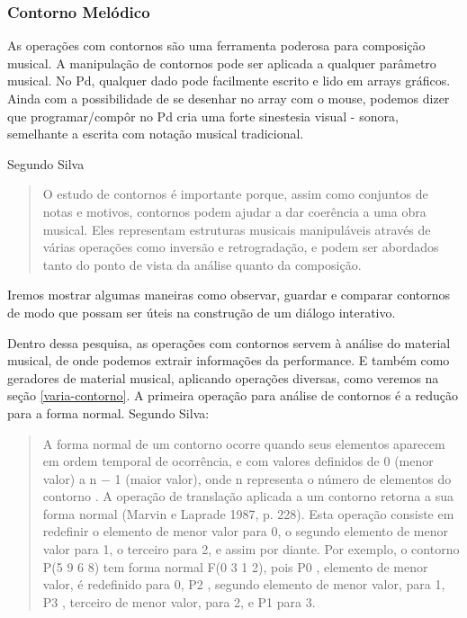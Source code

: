 \documentclass{ppgmus}
\begin{document}
\subsubsection{Contorno Melódico}
\label{contornos}


As operações com contornos são uma ferramenta poderosa para
composição musical\cite{sampaio08:torno}. A manipulação de contornos
pode ser aplicada a qualquer parâmetro musical.
No Pd, qualquer dado pode facilmente escrito e lido em arrays gráficos.
Ainda com a possibilidade de se desenhar no array com o mouse, podemos
dizer que programar/compôr no Pd cria uma
forte sinestesia visual - sonora, semelhante a escrita
com notação musical tradicional.

Segundo Silva \begin{quotation}
               O estudo de contornos é importante porque, assim como conjuntos de notas e motivos,
               contornos podem ajudar a dar coerência a uma obra musical. Eles representam estruturas
		musicais manipuláveis através de várias operações como inversão e retrogradação, e podem
		ser abordados tanto do ponto de vista da análise quanto da composição.
              \end{quotation} 


Iremos mostrar algumas maneiras como observar, guardar e comparar contornos de modo
que possam ser úteis na construção de um diálogo interativo.

Dentro dessa pesquisa, as operações com contornos servem à análise do material musical,
de onde podemos extrair informações da performance. E também como geradores de material
musical, aplicando operações diversas, como veremos na seção \ref{varia-contorno}.
A primeira operação para análise de contornos é a redução para a forma normal. Segundo Silva:

\begin{quotation}
 A forma normal de um contorno ocorre quando seus elementos aparecem em ordem
temporal de ocorrência, e com valores definidos de 0 (menor valor) a n − 1 (maior valor),
onde n  representa o número de elementos do contorno . A operação de translação aplicada a um
contorno retorna a sua forma normal (Marvin e Laprade 1987, p. 228). Esta operação
consiste em redefinir o elemento de menor valor para 0, o segundo elemento de menor
valor para 1, o terceiro para 2, e assim por diante. Por exemplo, o contorno P(5 9 6 8)
tem forma normal F(0 3 1 2), pois P0 , elemento de menor valor, é redefinido para 0, P2 ,
segundo elemento de menor valor, para 1, P3 , terceiro de menor valor, para 2, e P1 para
3.
\end{quotation}
\end{document}
